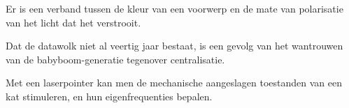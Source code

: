 \documentclass[10pt]{stellingen}
\newcommand\smallcaps[1]{{\scshape\MakeTextLowercase{#1}}}
\begin{document}
\begin{stelling}
Er is een verband tussen de kleur van een voorwerp en de mate van polarisatie van het licht dat het verstrooit.
\end{stelling}



\begin{stelling}
Dat de datawolk niet al veertig jaar bestaat, is een gevolg van het wantrouwen van de babyboom-generatie tegenover centralisatie.
\end{stelling}

\begin{stelling}
Met een laserpointer kan men de mechanische aangeslagen toestanden van een kat stimuleren, en hun eigenfrequenties bepalen.
\end{stelling}



\end{document}
